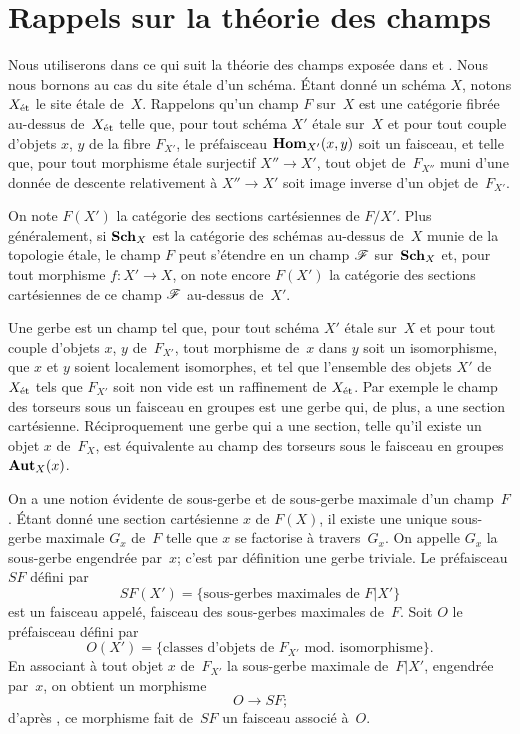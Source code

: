 \setcounter{section}{-1}

\section{Rappels sur la th\'eorie des champs}
\label{XIII.0}

Nous utiliserons dans ce qui suit la th\'eorie des champs
expos\'ee dans \cite{XIII.1} et \cite{XIII.2}. Nous nous bornons au cas du site
\'etale d'un sch\'ema. \'Etant donn\'e un sch\'ema $X$, notons
$X_{\mathrm{\acute{e}t}}$ le site \'etale de~$X$. Rappelons qu'un
champ $F$
sur~$X$ est une cat\'egorie fibr\'ee au-dessus de~$X_{\mathrm{\acute{e}t}}$ telle
que, pour tout sch\'ema $X'$ \'etale sur~$X$ et pour tout couple
d'objets
$x$, $y$ de la fibre $F_{X'}$, le pr\'efaisceau
$\operatorname{\mathbf{Hom}}_{X'}(x,y)$ soit un faisceau, et telle que, pour tout
morphisme \'etale surjectif $X'' \to X'$, tout objet de~$F_{X''}$
muni d'une donn\'ee de descente relativement \`a $X'' \to X'$ soit
image inverse d'un objet de~$F_{X'}$.

On note $F(X')$ la cat\'egorie des sections cart\'esiennes de
$F/X'$. Plus g\'en\'eralement, si $\mathbf{Sch}_X$ est la cat\'egorie
des sch\'emas au-dessus de~$X$ munie de la topologie \'etale, le
champ $F$ peut s'\'etendre en un champ $\cal{F}$ sur~$\mathbf{Sch}_X$ et,
pour tout morphisme $f\colon X' \to X$, on note encore $F(X')$ la
cat\'egorie des sections cart\'esiennes de ce champ $\cal{F}$
au-dessus de~$X'$.

Une gerbe
est un champ tel que, pour tout sch\'ema $X'$ \'etale
sur~$X$ et pour tout couple d'objets $x$, $y$ de~$F_{X'}$, tout
morphisme de~$x$ dans $y$ soit un isomorphisme, que $x$ et $y$ soient
localement isomorphes, et tel que l'ensemble des objets $X'$ de
$X_{\mathrm{\acute{e}t}}$ tels que $F_{X'}$ soit non vide est un raffinement de
$X_{\mathrm{\acute{e}t}}$. Par exemple le champ des torseurs sous un faisceau en groupes
est une gerbe qui, de plus, a une section cart\'esienne.
R\'eciproquement une gerbe qui a une section, \ie telle qu'il
existe un objet $x$ de~$F_X$, est \'equivalente au champ des
torseurs sous le faisceau
en groupes $\operatorname{\mathbf{Aut}}_X(x)$.

On a une notion \'evidente de sous-gerbe et de sous-gerbe maximale
d'un champ~$F$. \'Etant donn\'e une section cart\'esienne $x$ de
$F(X)$, il existe une unique sous-gerbe maximale $G_x$ de~$F$ telle
que $x$ se factorise \`a travers~$G_x$. On appelle $G_x$ la
sous-gerbe engendr\'ee par~$x$; c'est par d\'efinition une gerbe
triviale.
Le pr\'efaisceau $SF$
\label{indnot:mb}d\'efini par
$$
SF(X') = \{ \text{sous-gerbes maximales de }F|X' \}
$$
est un faisceau appel\'e, faisceau des sous-gerbes maximales
de~$F$.
Soit $O$ le pr\'efaisceau d\'efini par
$$
O(X') = \{ \text{classes d'objets de }F_{X'}\text{ mod. isomorphisme}
\} \text{.}
$$
En associant \`a tout objet $x$ de~$F_{X'}$ la sous-gerbe maximale
de~$F|X'$, engendr\'ee par~$x$, on obtient un morphisme
$$
O \to SF \text{;}
$$
d'apr\`es \cite[III 2.1.4]{XIII.2}, ce morphisme fait de~$SF$ un faisceau
associ\'e \`a~$O$.

